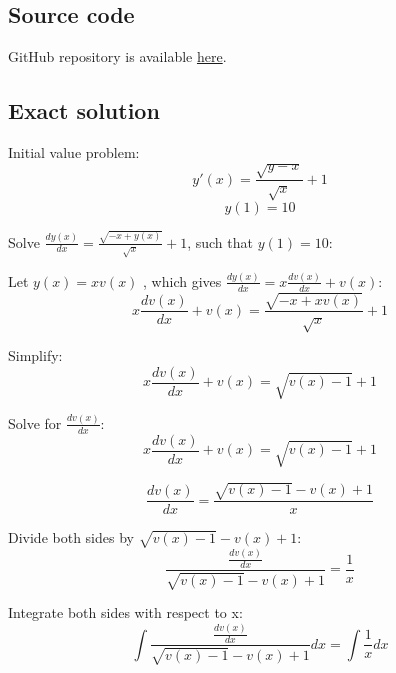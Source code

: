 \documentclass[12pt,letterpaper]{article}
\begin{document}
\begin{center}
    \section*{Source code}
\end{center}

GitHub repository is available \href{https://github.com/AlekseyKorshuk/numerical-methods}{here}.

\begin{center}
    \section*{Exact solution}
\end{center}

Initial value problem:
\begin{equation}
     y'(x) = \frac {\sqrt {y - x}}{\sqrt{x}} + 1
\end{equation}
\begin{equation}
     y(1) = 10
\end{equation}


Solve $ \frac{dy(x)}{ dx} = \frac {\sqrt{-x + y(x)}}{ \sqrt{x}} + 1$, such that $y(1) = 10$:

Let $ y(x) = xv(x)$ , which gives $ \frac{dy(x)}{dx} = x \frac{ dv(x)}{ dx} + v(x)$:
\begin{equation}
     x \frac{ dv(x)}{ dx} + v(x) = \frac{\sqrt{-x + x v(x)}}{\sqrt{x}} + 1
\end{equation}

Simplify:
\begin{equation}
     x \frac{ dv(x)}{ dx} + v(x) = \sqrt{v(x) - 1} + 1
\end{equation}

Solve for $\frac{dv(x)}{dx}$:
\begin{equation}
     x \frac{ dv(x)}{ dx} + v(x) = \sqrt{v(x) - 1} + 1
\end{equation}

\begin{equation}
     \frac{ dv(x)}{ dx} = \frac{ \sqrt{v(x) - 1} - v(x) + 1}{x}
\end{equation}

Divide both sides by $\sqrt{v(x) - 1} - v(x) + 1$:
\begin{equation}
     \frac{\frac{ dv(x)}{ dx}}{\sqrt{v(x) - 1} - v(x) + 1} = \frac{1}{x}
\end{equation}

Integrate both sides with respect to x:
\begin{equation}
    \int {
    \frac{\frac{ dv(x)}{ dx}}{\sqrt{v(x) - 1} - v(x) + 1}
    }dx = \int {\frac{1}{x}}dx
\end{equation}
\end{document}
